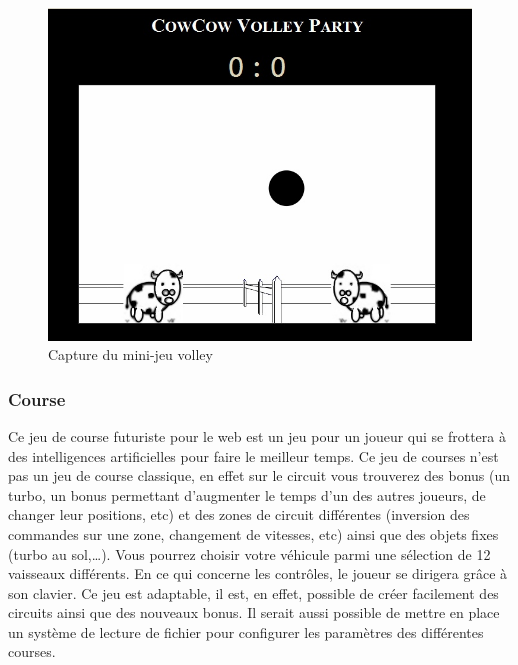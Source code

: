 \begin{figure}
 \includegraphics[width=\linewidth]{img/capturejeu_volleycowcow}
 \caption{Capture du mini-jeu volley}
 \label{fig:game_volley}
\end{figure}

\subsubsection{Course}

Ce jeu de course futuriste pour le web est un jeu pour un joueur qui se frottera à des intelligences artificielles pour faire le meilleur temps. 
Ce jeu de courses n’est pas un jeu de course classique, en effet sur le circuit vous trouverez des bonus 
(un turbo, un bonus permettant d’augmenter le temps d’un des autres joueurs, de changer leur positions, etc) 
et des zones de circuit différentes (inversion des commandes sur une zone, changement de vitesses, etc) 
ainsi que des objets fixes (turbo au sol,…). Vous pourrez choisir votre véhicule parmi une sélection de 12 vaisseaux différents. 
 En ce qui concerne les contrôles, le joueur se dirigera grâce à son clavier. Ce jeu est adaptable, il est, en effet, 
possible de créer facilement des circuits ainsi que des nouveaux bonus. Il serait aussi possible de mettre en place un système de 
lecture de fichier pour configurer les paramètres des différentes courses.

